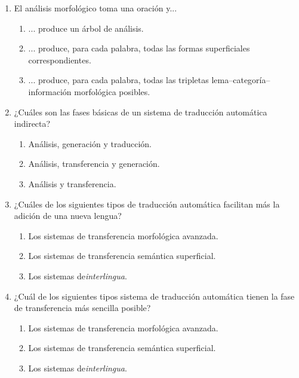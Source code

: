 \begin{enumerate}
\item El análisis morfológico toma una oración y... \begin{enumerate} \item ... produce un árbol de análisis. \item ... produce, para cada palabra, todas las formas superficiales correspondientes. \item ... produce, para cada palabra, todas las tripletas lema--categoría--información morfológica posibles. \end{enumerate} 

\item ¿Cuáles son las fases básicas de un sistema de traducción automática indirecta? \begin{enumerate} \item Análisis, generación y traducción. \item Análisis, transferencia y generación. \item Análisis y transferencia. \end{enumerate} 

\item ¿Cuáles de los siguientes tipos de traducción automática facilitan más la adición de una nueva lengua? \begin{enumerate} \item Los sistemas de transferencia morfológica avanzada. \item Los sistemas de transferencia semántica superficial. \item Los sistemas de\emph{interlingua}. \end{enumerate} 

\item ¿Cuál de los siguientes tipos sistema de traducción automática tienen la fase de transferencia más sencilla posible? \begin{enumerate} \item Los sistemas de transferencia morfológica avanzada. \item Los sistemas de transferencia semántica superficial. \item Los sistemas de\emph{interlingua}. \end{enumerate} 


\end{enumerate}
